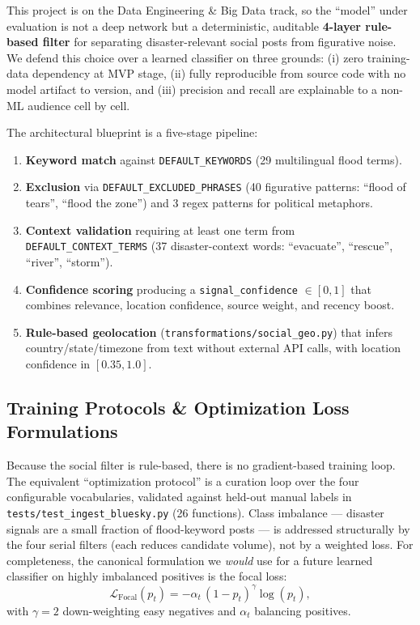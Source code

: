 \documentclass[11pt,a4paper]{article}
\begin{document}
This project is on the Data Engineering \& Big Data track, so the ``model''
under evaluation is not a deep network but a deterministic, auditable
\textbf{4-layer rule-based filter} for separating disaster-relevant social
posts from figurative noise. We defend this choice over a learned classifier
on three grounds: (i) zero training-data dependency at MVP stage, (ii)
fully reproducible from source code with no model artifact to version, and
(iii) precision and recall are explainable to a non-ML audience cell by cell.

The architectural blueprint is a five-stage pipeline:
\begin{enumerate}
    \item \textbf{Keyword match} against \texttt{DEFAULT\_KEYWORDS} (29
    multilingual flood terms).
    \item \textbf{Exclusion} via \texttt{DEFAULT\_EXCLUDED\_PHRASES} (40
    figurative patterns: ``flood of tears'', ``flood the zone'') and 3
    regex patterns for political metaphors.
    \item \textbf{Context validation} requiring at least one term from
    \texttt{DEFAULT\_CONTEXT\_TERMS} (37 disaster-context words:
    ``evacuate'', ``rescue'', ``river'', ``storm'').
    \item \textbf{Confidence scoring} producing a
    \texttt{signal\_confidence} $\in [0, 1]$ that combines relevance,
    location confidence, source weight, and recency boost.
    \item \textbf{Rule-based geolocation} (\texttt{transformations/social\_geo.py})
    that infers country/state/timezone from text without external API
    calls, with location confidence in $[0.35, 1.0]$.
\end{enumerate}

\subsection{Training Protocols \& Optimization Loss Formulations}

Because the social filter is rule-based, there is no gradient-based
training loop. The equivalent ``optimization protocol'' is a curation loop
over the four configurable vocabularies, validated against held-out manual
labels in \texttt{tests/test\_ingest\_bluesky.py} (26 functions). Class
imbalance --- disaster signals are a small fraction of flood-keyword posts
--- is addressed structurally by the four serial filters (each reduces
candidate volume), not by a weighted loss. For completeness, the canonical
formulation we \emph{would} use for a future learned classifier on highly
imbalanced positives is the focal loss:
\begin{equation}
    \mathcal{L}_{\text{Focal}}(p_t) = -\alpha_t \,(1 - p_t)^{\gamma} \log(p_t),
\end{equation}
with $\gamma = 2$ down-weighting easy negatives and $\alpha_t$ balancing
positives.
\end{document}
